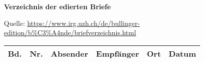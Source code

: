 \documentclass[10pt,a4paper,landscape]{report}
\begin{document}
{\LARGE \textbf{Verzeichnis der edierten Briefe}}

\vspace*{0.1cm}
Quelle: \url{https://www.irg.uzh.ch/de/bullinger-edition/b\%C3\%A4nde/briefverzeichnis.html}

\vspace*{0.3cm}


\begin{footnotesize}
\begin{longtable}{rrp{6.3cm}p{5cm}cl}
\toprule
Bd. & Nr. & Absender & Empfänger & Ort & Datum\\
\midrule

\bottomrule
\end{longtable}
\end{footnotesize}
\end{document}
